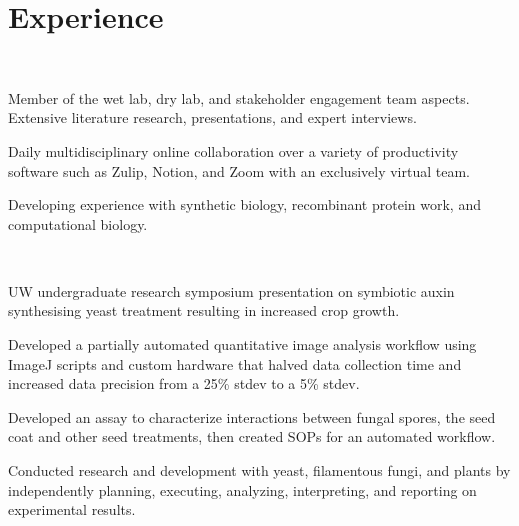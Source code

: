 \documentclass[]{forrest-resume-interfont}
\begin{document}

\section{\protect{} Experience}
\\
\vspace{3pt}
\vspace{-5pt}
\begin{tightemize}
\item Member of the wet lab, dry lab, and stakeholder engagement team aspects. Extensive literature research, presentations, and expert interviews.
\item Daily multidisciplinary online collaboration over a variety of productivity software such as Zulip, Notion, and Zoom with an exclusively virtual team. 
\item Developing experience with synthetic biology, recombinant protein work, and computational biology.
\end{tightemize}
\vspace{\topsep} %

\\
\vspace{3pt}
\vspace{-5pt}
\begin{tightemize}
\item UW undergraduate research symposium presentation on symbiotic auxin synthesising yeast treatment resulting in increased crop growth.
\item Developed a partially automated quantitative image analysis workflow using ImageJ scripts and custom hardware that halved data collection time and increased data precision from a 25\% stdev to a 5\% stdev.
\item Developed an assay to characterize interactions between fungal spores, the seed coat and other seed treatments, then created SOPs for an automated workflow.
\item Conducted research and development with yeast, filamentous fungi, and plants by independently planning, executing, analyzing, interpreting, and reporting on experimental results. 
\end{tightemize}
\end{document}
